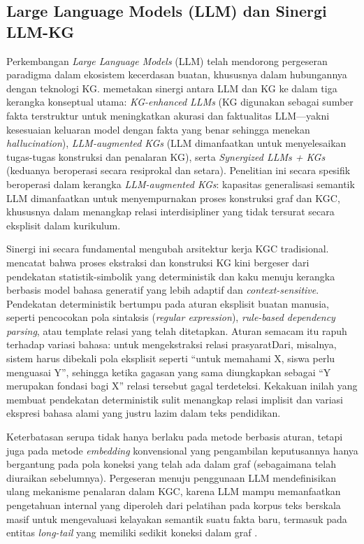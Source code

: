 \documentclass[../../thesis]{subfiles}
\begin{document}
\subsection{Large Language Models (LLM) dan Sinergi LLM-KG}

Perkembangan \textit{Large Language Models} (LLM) telah mendorong
pergeseran paradigma dalam ekosistem kecerdasan buatan, khususnya dalam
hubungannya dengan teknologi KG. \textcite{pan_unifying_2024} memetakan sinergi
antara LLM dan KG ke dalam tiga kerangka konseptual utama:
\textit{KG-enhanced LLMs} (KG digunakan sebagai sumber fakta terstruktur
untuk meningkatkan akurasi dan faktualitas LLM---yakni kesesuaian keluaran
model dengan fakta yang benar sehingga menekan \textit{hallucination}),
\textit{LLM-augmented KGs} (LLM dimanfaatkan untuk
menyelesaikan tugas-tugas konstruksi dan penalaran KG), serta
\textit{Synergized LLMs + KGs} (keduanya beroperasi secara resiprokal
dan setara). Penelitian ini secara spesifik beroperasi dalam kerangka
\textit{LLM-augmented KGs}: kapasitas generalisasi semantik LLM
dimanfaatkan untuk menyempurnakan proses konstruksi graf dan KGC,
khususnya dalam menangkap relasi interdisipliner yang tidak tersurat
secara eksplisit dalam kurikulum.

Sinergi ini secara fundamental mengubah arsitektur kerja KGC
tradisional. \textcite{bian_llm-empowered_2025} mencatat bahwa proses ekstraksi dan
konstruksi KG kini bergeser dari pendekatan statistik-simbolik yang
deterministik dan kaku menuju kerangka berbasis model bahasa generatif
yang lebih adaptif dan \textit{context-sensitive}. Pendekatan deterministik
bertumpu pada aturan eksplisit buatan manusia, seperti pencocokan pola
sintaksis (\textit{regular expression}), \textit{rule-based dependency
parsing}, atau template relasi yang telah ditetapkan. Aturan semacam itu
rapuh terhadap variasi bahasa: untuk mengekstraksi relasi prasyaratDari,
misalnya, sistem harus dibekali pola eksplisit seperti ``untuk memahami X,
siswa perlu menguasai Y'', sehingga ketika gagasan yang sama diungkapkan
sebagai ``Y merupakan fondasi bagi X'' relasi tersebut gagal terdeteksi.
Kekakuan inilah yang membuat pendekatan deterministik sulit menangkap
relasi implisit dan variasi ekspresi bahasa alami yang justru lazim dalam
teks pendidikan.

Keterbatasan serupa tidak hanya berlaku pada metode berbasis aturan,
tetapi juga pada metode \textit{embedding} konvensional yang pengambilan
keputusannya hanya bergantung pada pola koneksi yang telah ada dalam
graf (sebagaimana telah diuraikan sebelumnya). Pergeseran menuju
penggunaan LLM mendefinisikan ulang mekanisme penalaran dalam KGC,
karena LLM mampu memanfaatkan pengetahuan internal yang diperoleh dari
pelatihan pada korpus teks berskala masif untuk mengevaluasi kelayakan
semantik suatu fakta baru, termasuk pada entitas \textit{long-tail} yang
memiliki sedikit koneksi dalam graf \parencite{yao_exploring_2025, wei_kicgpt_2023}.
\end{document}
